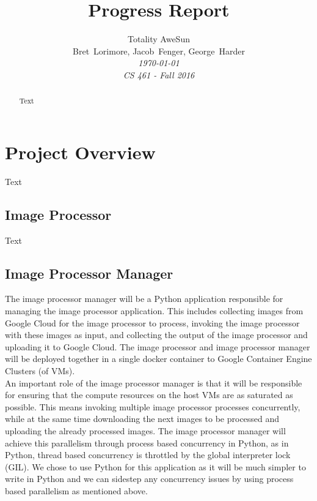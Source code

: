 \documentclass[10pt, onecolumn, draftclsnofoot, letterpaper, compsoc]{IEEEtran}
\title{Progress Report}
\author{Totality AweSun \\
		Bret~Lorimore, Jacob~Fenger, George~Harder \\
		\textit{\today \\
		CS 461 - Fall 2016}}
\begin{document}
\maketitle

\begin{abstract}

Text

\end{abstract}

\newpage

\tableofcontents

\newpage

\section{Project Overview}

Text

\subsection{Image Processor}

Text

\subsection{Image Processor Manager}

The image processor manager will be a Python application responsible for managing the image processor
application. This includes collecting images from Google Cloud for the image processor to process, 
invoking the image processor with these images as input, and collecting the output of the image 
processor and uploading it to Google Cloud. The image processor and image processor manager will be 
deployed together in a single docker container to Google Container Engine Clusters (of VMs). \\

An important role of the image processor manager is that it will be responsible for ensuring that 
the compute resources on the host VMs are as saturated as possible. This means invoking multiple 
image processor processes concurrently, while at the same time downloading the next images to be 
processed and uploading the already processed images. The image processor manager will achieve 
this parallelism through process based concurrency in Python, as in Python, thread based concurrency 
is throttled by the global interpreter lock (GIL). We chose to use Python for this application as it 
will be much simpler to write in Python and we can sidestep any concurrency issues by using process 
based parallelism as mentioned above. \\
\end{document}
